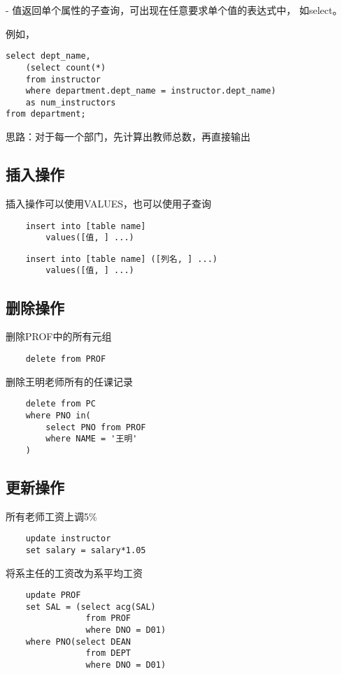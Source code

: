 \documentclass{article}        %
\begin{document}
- 值返回单个属性的子查询，可出现在任意要求单个值的表达式中，
如select。 

例如，

\begin{verbatim}
select dept_name, 
    (select count(*)
    from instructor 
    where department.dept_name = instructor.dept_name) 
    as num_instructors 
from department;
\end{verbatim}

思路：对于每一个部门，先计算出教师总数，再直接输出

\subsection{插入操作}

插入操作可以使用VALUES，也可以使用子查询

\begin{verbatim}
    insert into [table name] 
        values([值, ] ...)
\end{verbatim}

\begin{verbatim}
    insert into [table name] ([列名, ] ...) 
        values([值, ] ...)
\end{verbatim}

\subsection{删除操作}

删除PROF中的所有元组

\begin{verbatim}
    delete from PROF
\end{verbatim}

删除王明老师所有的任课记录

\begin{verbatim}
    delete from PC 
    where PNO in(
        select PNO from PROF 
        where NAME = '王明'
    )
\end{verbatim}

\subsection{更新操作}

所有老师工资上调5\% 
\begin{verbatim}
    update instructor 
    set salary = salary*1.05
\end{verbatim}

将系主任的工资改为系平均工资 
\begin{verbatim}
    update PROF 
    set SAL = (select acg(SAL) 
                from PROF 
                where DNO = D01)
    where PNO(select DEAN 
                from DEPT 
                where DNO = D01)
\end{verbatim}
\end{document}
